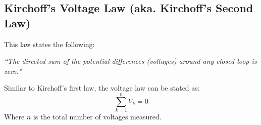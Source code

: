 \documentclass[12pt,a4paper,oneside]{article}
\begin{document}
\subsection{Kirchoff's Voltage Law (aka. Kirchoff's Second Law)}
This law states the following:
\begin{center}
	\textit{``The directed sum of the potential differences (voltages) around any closed loop is zero."}
\end{center}
Similar to Kirchoff's first law, the voltage law can be stated as:
\[
	\sum_{k=1}^n V_k = 0
\]
Where \(n\) is the total number of voltages measured.
\end{document}
